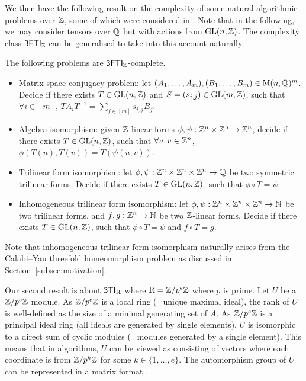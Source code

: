 We then have the following result on the complexity of some natural algorithmic problems over $\mathbb{Z}$, some of which were considered in \cite{GS-overview}. Note that in the following, we may consider tensors over $\mathbb{Q}$ but with actions from $\mathrm{GL}(n, \mathbb{Z})$. The complexity class ${\sf 3FTI}_{\mathbb{Z}}$ can be generalised to take into this account naturally.
\begin{corollary}\label{cor:TIZ-complete}
	The following problems are ${\sf 3FTI}_{\mathbb{Z}}$-complete. 
	\begin{itemize}
		\item Matrix space conjugacy problem: let $(A_1, \dots, A_m), (B_1, \dots, B_m)\in \mathrm{M}(n, \mathbb{Q})^m$. Decide if there exists $T\in\mathrm{GL}(n, \mathbb{Z})$ and $S=(s_{i,j})\in\mathrm{GL}(m, \mathbb{Z})$, such that $\forall i\in[m]$, $TA_iT^{-1}=\sum_{j\in[m]}s_{i,j}B_j$. 
		\item Algebra isomorphism: given $\mathbb{Z}$-linear forms $\phi, \psi:\mathbb{Z}^n\times\mathbb{Z}^n\to\mathbb{Z}^n$, decide if there exists $T\in\mathrm{GL}(n, \mathbb{Z})$, such that $\forall u, v\in \mathbb{Z}^n$, $\phi(T(u), T(v))=T(\psi(u, v))$. 
		\item Trilinear form isomorphism: let $\phi, \psi:\mathbb{Z}^n\times\mathbb{Z}^n\times\mathbb{Z}^n\to \mathbb{Q}$ be two symmetric trilinear forms. Decide if there exists $T\in\mathrm{GL}(n, \mathbb{Z})$, such that $\phi\circ T=\psi$. 
		\item Inhomogeneous trilinear form isomorphism: let $\phi, \psi:\mathbb{Z}^n\times\mathbb{Z}^n\times \mathbb{Z}^n\to \mathbb{N}$ be two trilinear forms, and $f, g:\mathbb{Z}^n\to \mathbb{N}$ be two $\mathbb{Z}$-linear forms. Decide if there exists $T\in\mathrm{GL}(n, \mathbb{Z})$, such that $\phi\circ T=\psi$ and $f\circ T=g$.
	\end{itemize}
\end{corollary}
Note that inhomogeneous trilinear form isomorphism naturally arises from the Calabi--Yau threefold homeomorphism problem as discussed in Section~\ref{subsec:motivation}.

Our second result is about ${\sf 3TI}_{\mathrm{R}}$ where $\mathrm{R}=\mathbb{Z}/p^e\mathbb{Z}$ where $p$ is prime. Let $U$ be a $\mathbb{Z}/p^e\mathbb{Z}$ module. As $\mathbb{Z}/p^e\mathbb{Z}$ is a local ring (=unique maximal ideal), the rank of $U$ is well-defined as the size of a minimal generating set of $A$. As $\mathbb{Z}/p^e\mathbb{Z}$ is a principal ideal ring (all ideals are generated by single elements), $U$ is isomorphic to a direct sum of cyclic modules (=modules generated by a single element). This means that in algorithms, $U$ can be viewed as consisting of vectors where each coordinate is from $\mathbb{Z}/p^k\mathbb{Z}$ for some $k\in \{1, \dots, e\}$. The automorphism group of $U$ can be represented in a matrix format \cite{Ranum, HillarRhea}. 

